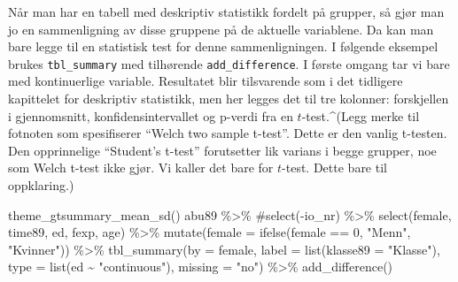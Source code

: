 \documentclass[
  letterpaper,
  DIV=11,
  numbers=noendperiod]{scrreprt}
\newenvironment{Shaded}{\begin{snugshade}}{\end{snugshade}}
\newcommand{\AttributeTok}[1]{\textcolor[rgb]{0.40,0.45,0.13}{#1}}
\newcommand{\CommentTok}[1]{\textcolor[rgb]{0.37,0.37,0.37}{#1}}
\newcommand{\DecValTok}[1]{\textcolor[rgb]{0.68,0.00,0.00}{#1}}
\newcommand{\FunctionTok}[1]{\textcolor[rgb]{0.28,0.35,0.67}{#1}}
\newcommand{\NormalTok}[1]{\textcolor[rgb]{0.00,0.23,0.31}{#1}}
\newcommand{\SpecialCharTok}[1]{\textcolor[rgb]{0.37,0.37,0.37}{#1}}
\newcommand{\StringTok}[1]{\textcolor[rgb]{0.13,0.47,0.30}{#1}}
\theoremstyle{definition}
\theoremstyle{remark}
\begin{document}
Når man har en tabell med deskriptiv statistikk fordelt på grupper, så
gjør man jo en sammenligning av disse gruppene på de aktuelle
variablene. Da kan man bare legge til en statistisk test for denne
sammenligningen. I følgende eksempel brukes \texttt{tbl\_summary} med
tilhørende \texttt{add\_difference}. I første omgang tar vi bare med
kontinuerlige variable. Resultatet blir tilsvarende som i det tidligere
kapittelet for deskriptiv statistikk, men her legges det til tre
kolonner: forskjellen i gjennomsnitt, konfidensintervallet og p-verdi
fra en \(t\)-test.\^{}(Legg merke til fotnoten som spesifiserer ``Welch
two sample t-test''. Dette er den vanlig t-testen. Den opprinnelige
``Student's t-test'' forutsetter lik varians i begge grupper, noe som
Welch t-test ikke gjør. Vi kaller det bare for \(t\)-test. Dette bare
til oppklaring.)

\begin{Shaded}
\begin{Highlighting}[]
\FunctionTok{theme\_gtsummary\_mean\_sd}\NormalTok{()}
\NormalTok{abu89 }\SpecialCharTok{\%\textgreater{}\%} 
  \CommentTok{\#select({-}io\_nr) \%\textgreater{}\%}
  \FunctionTok{select}\NormalTok{(female, time89, ed,  fexp, age) }\SpecialCharTok{\%\textgreater{}\%} 
  \FunctionTok{mutate}\NormalTok{(}\AttributeTok{female =} \FunctionTok{ifelse}\NormalTok{(female }\SpecialCharTok{==} \DecValTok{0}\NormalTok{, }\StringTok{"Menn"}\NormalTok{, }\StringTok{"Kvinner"}\NormalTok{)) }\SpecialCharTok{\%\textgreater{}\%} 
    \FunctionTok{tbl\_summary}\NormalTok{(}\AttributeTok{by =}\NormalTok{ female, }
                \AttributeTok{label =} \FunctionTok{list}\NormalTok{(}\AttributeTok{klasse89 =} \StringTok{"Klasse"}\NormalTok{), }
              \AttributeTok{type =} \FunctionTok{list}\NormalTok{(ed }\SpecialCharTok{\textasciitilde{}} \StringTok{"continuous"}\NormalTok{), }
              \AttributeTok{missing =} \StringTok{"no"}\NormalTok{) }\SpecialCharTok{\%\textgreater{}\%} 
  \FunctionTok{add\_difference}\NormalTok{() }
\end{Highlighting}
\end{Shaded}
\end{document}
